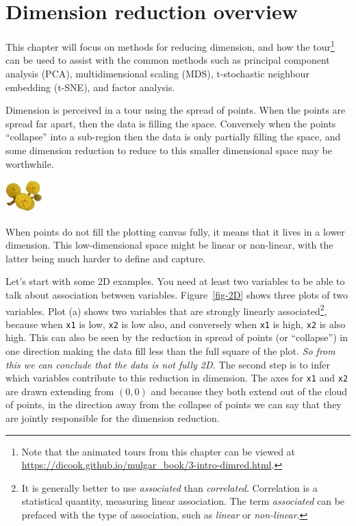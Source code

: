 \documentclass[
  letterpaper,
]{krantz}
\newcommand{\infobox}[1]{%
\noindent\colorbox{info!30}{%
\begin{minipage}{0.98\linewidth}%
    \centering%
    \begin{minipage}[c]{0.15\linewidth} %
      \includegraphics[width=1.5cm]{images/mulga-flowers2.png} %
    \end{minipage}%
    \hfill %
    \begin{minipage}[c]{0.8\linewidth} %
      \bigskip%
      \textsf{#1}%
      \bigskip%
    \end{minipage}%
    \hspace*{3mm}%
  \end{minipage}%
}%
}
\begin{document}

\chapter{Dimension reduction overview}\label{sec-dimension-overview}

This chapter will focus on methods for reducing dimension, and how the
tour\footnote{Note that the animated tours from this chapter can be
  viewed at
  \url{https://dicook.github.io/mulgar_book/3-intro-dimred.html}.} can
be used to assist with the common methods such as principal component
analysis (PCA), multidimensional scaling (MDS), t-stochastic neighbour
embedding (t-SNE), and factor analysis.

Dimension is perceived in a tour using the spread of points. When the
points are spread far apart, then the data is filling the space.
Conversely when the points ``collapse'' into a sub-region then the data
is only partially filling the space, and some dimension reduction to
reduce to this smaller dimensional space may be worthwhile.

\infobox{When points do not fill the plotting canvas fully, it means that it lives in a lower dimension. This low-dimensional space might be linear or non-linear, with the latter being much harder to define and capture.}

Let's start with some 2D examples. You need at least two variables to be
able to talk about association between variables. Figure~\ref{fig-2D}
shows three plots of two variables. Plot (a) shows two variables that
are strongly linearly associated\footnote{It is generally better to use
  \emph{associated} than \emph{correlated}. Correlation is a statistical
  quantity, measuring linear association. The term \emph{associated} can
  be prefaced with the type of association, such as \emph{linear} or
  \emph{non-linear}.}, because when \texttt{x1} is low, \texttt{x2} is
low also, and conversely when \texttt{x1} is high, \texttt{x2} is also
high. This can also be seen by the reduction in spread of points (or
``collapse'') in one direction making the data fill less than the full
square of the plot. \emph{So from this we can conclude that the data is
not fully 2D.} The second step is to infer which variables contribute to
this reduction in dimension. The axes for \texttt{x1} and \texttt{x2}
are drawn extending from \((0,0)\) and because they both extend out of
the cloud of points, in the direction away from the collapse of points
we can say that they are jointly responsible for the dimension
reduction.
\end{document}
